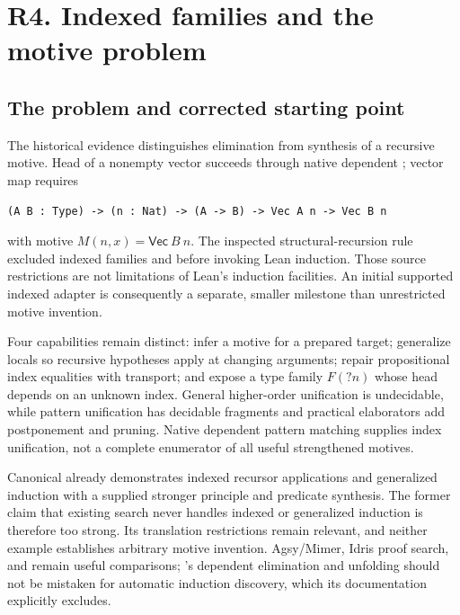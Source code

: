 \section{R4. Indexed families and the motive problem}\label{sec:dependent}

\subsection{The problem and corrected starting point}\label{sec:dependent-scope}

The historical evidence distinguishes elimination from synthesis of a recursive
motive. Head of a nonempty vector succeeds through native dependent
; vector map requires
\begin{lstlisting}
(A B : Type) -> (n : Nat) -> (A -> B) -> Vec A n -> Vec B n
\end{lstlisting}
with motive $M(n,x)=\mathsf{Vec}\ B\ n$. The inspected structural-recursion
rule excluded indexed families and  before invoking Lean induction.
Those source restrictions are not limitations of Lean's induction facilities.
An initial supported indexed adapter is consequently a separate, smaller
milestone than unrestricted motive invention.

Four capabilities remain distinct: infer a motive for a prepared target;
generalize locals so recursive hypotheses apply at changing arguments; repair
propositional index equalities with transport; and expose a type family
$F(?n)$ whose head depends on an unknown index. General higher-order unification
is undecidable, while pattern unification has decidable fragments and
practical elaborators add postponement and pruning\cite{huet75,miller91,abelpientka11}.
Native dependent pattern matching supplies index unification, not a complete
enumerator of all useful strengthened motives\cite{cockx}.

Canonical already demonstrates indexed recursor applications and generalized
induction with a supplied stronger principle and predicate synthesis. The
former claim that existing search never handles indexed or generalized
induction is therefore too strong. Its translation restrictions remain
relevant, and neither example establishes arbitrary motive invention.
Agsy/Mimer, Idris proof search, and  remain useful comparisons;
's dependent elimination and unfolding should not be mistaken for
automatic induction discovery, which its documentation explicitly excludes.
\cite{canonical,agsy,sauto,sautodocs}

